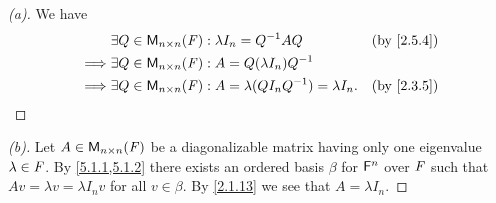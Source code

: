 \begin{proof}[(a)]
  We have
  \begin{align*}
             & \exists Q \in \ms{n}{n}{\F} : \lambda I_n = Q^{-1} A Q                  &  & \text{(by \cref{2.5.4})} \\
    \implies & \exists Q \in \ms{n}{n}{\F} : A = Q (\lambda I_n) Q^{-1}                                              \\
    \implies & \exists Q \in \ms{n}{n}{\F} : A = \lambda (Q I_n Q^{-1}) = \lambda I_n. &  & \text{(by \cref{2.3.5})}
  \end{align*}
\end{proof}

\begin{proof}[(b)]
  Let \(A \in \mathsf{M}_{{n} \times n}({\mathit{F}})\) be a diagonalizable matrix having only one eigenvalue \(\lambda \in \mathit{F}\).
  By \cref{5.1.1,5.1.2} there exists an ordered basis \(\beta\) for \(\mathsf{F}^n\) over \(\mathit{F}\) such that \(Av = \lambda v = \lambda I_n v\) for all \(v \in \beta\).
  By \cref{2.1.13} we see that \(A = \lambda I_n\).
\end{proof}


